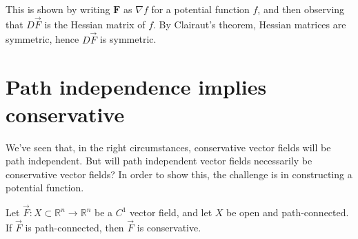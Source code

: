 \documentclass{ximera}
\begin{document}
This is shown by writing $\mathbf{F}$ as $\nabla f$ for a potential function $f$, and then observing that $D\vec{F}$ is the Hessian matrix of $f$. By Clairaut's theorem, Hessian matrices are symmetric, hence $D\vec{F}$ is symmetric.

\section*{Path independence implies conservative}

We've seen that, in the right circumstances, conservative vector fields will be path independent. But will path independent vector fields necessarily be conservative vector fields? In order to show this, the challenge is in constructing a potential function.

\begin{proposition}
Let $\vec{F}:X\subset\mathbb{R}^n\rightarrow \mathbb{R}^n$ be a $C^1$ vector field, and let $X$ be open and path-connected. If $\vec{F}$ is path-connected, then $\vec{F}$ is conservative.
\end{proposition}
\end{document}
